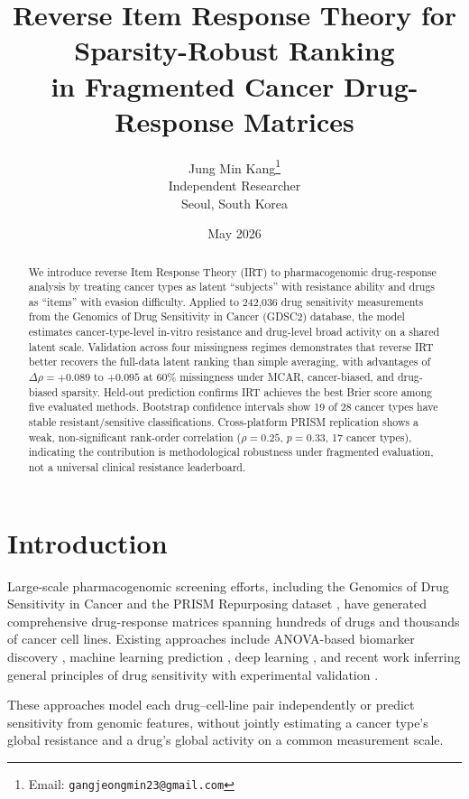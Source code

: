 \documentclass[11pt]{article}
\title{Reverse Item Response Theory for Sparsity-Robust Ranking\\in Fragmented Cancer Drug-Response Matrices}
\author{Jung Min Kang\thanks{Email: \texttt{gangjeongmin23@gmail.com}}\\
Independent Researcher\\
Seoul, South Korea}
\date{May 2026}
\begin{document}
\maketitle

\begin{abstract}
We introduce reverse Item Response Theory (IRT) to pharmacogenomic drug-response analysis by treating cancer types as latent ``subjects'' with resistance ability and drugs as ``items'' with evasion difficulty. Applied to 242,036 drug sensitivity measurements from the Genomics of Drug Sensitivity in Cancer (GDSC2) database, the model estimates cancer-type-level in-vitro resistance and drug-level broad activity on a shared latent scale. Validation across four missingness regimes demonstrates that reverse IRT better recovers the full-data latent ranking than simple averaging, with advantages of $\Delta\rho = +0.089$ to $+0.095$ at 60\% missingness under MCAR, cancer-biased, and drug-biased sparsity. Held-out prediction confirms IRT achieves the best Brier score among five evaluated methods. Bootstrap confidence intervals show 19 of 28 cancer types have stable resistant/sensitive classifications. Cross-platform PRISM replication shows a weak, non-significant rank-order correlation ($\rho = 0.25$, $p = 0.33$, 17 cancer types), indicating the contribution is methodological robustness under fragmented evaluation, not a universal clinical resistance leaderboard.
\end{abstract}

\section{Introduction}

Large-scale pharmacogenomic screening efforts, including the Genomics of Drug Sensitivity in Cancer \citep[GDSC;][]{yang2012gdsc,iorio2016landscape} and the PRISM Repurposing dataset \citep{corsello2020}, have generated comprehensive drug-response matrices spanning hundreds of drugs and thousands of cancer cell lines. Existing approaches include ANOVA-based biomarker discovery \citep{garnett2012}, machine learning prediction \citep{costello2014}, deep learning \citep{liu2020deepcdr}, and recent work inferring general principles of drug sensitivity with experimental validation \citep{carli2025}.

These approaches model each drug--cell-line pair independently or predict sensitivity from genomic features, without jointly estimating a cancer type's global resistance and a drug's global activity on a common measurement scale.
\end{document}
